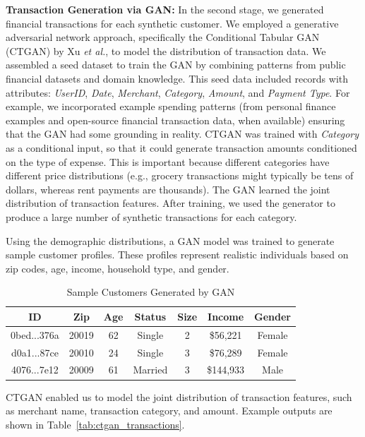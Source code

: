 \documentclass{scrartcl}
\begin{document}
\textbf{Transaction Generation via GAN:} In the second stage, we generated financial transactions for each synthetic customer. We employed a generative adversarial network approach, specifically the Conditional Tabular GAN (CTGAN) by Xu \textit{et al.}, to model the distribution of transaction data. We assembled a seed dataset to train the GAN by combining patterns from public financial datasets and domain knowledge. This seed data included records with attributes: \textit{UserID}, \textit{Date}, \textit{Merchant}, \textit{Category}, \textit{Amount}, and \textit{Payment Type}. For example, we incorporated example spending patterns (from personal finance examples and open-source financial transaction data, when available) ensuring that the GAN had some grounding in reality. CTGAN was trained with \textit{Category} as a conditional input, so that it could generate transaction amounts conditioned on the type of expense. This is important because different categories have different price distributions (e.g., grocery transactions might typically be tens of dollars, whereas rent payments are thousands). The GAN learned the joint distribution of transaction features. After training, we used the generator to produce a large number of synthetic transactions for each category.

Using the demographic distributions, a GAN model was trained to generate sample customer profiles. These profiles represent realistic individuals based on zip codes, age, income, household type, and gender.

\begin{table}[ht]
\centering
\caption{Sample Customers Generated by GAN}
\label{tab:gan_customers}
\begin{tabular}{|c|c|c|c|c|c|c|}
\hline
\textbf{ID} & \textbf{Zip} & \textbf{Age} & \textbf{Status} & \textbf{Size} & \textbf{Income} & \textbf{Gender} \\
\hline
0bed...376a & 20019 & 62 & Single & 2 & \$56,221 & Female \\
d0a1...87ce & 20010 & 24 & Single & 3 & \$76,289 & Female \\
4076...7e12 & 20009 & 61 & Married & 3 & \$144,933 & Male \\
\hline
\end{tabular}
\end{table}

CTGAN enabled us to model the joint distribution of transaction features, such as merchant name, transaction category, and amount. Example outputs are shown in Table~\ref{tab:ctgan_transactions}.
\end{document}

